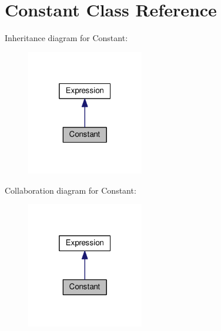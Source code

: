 \hypertarget{classConstant}{}\section{Constant Class Reference}
\label{classConstant}


Inheritance diagram for Constant\+:\nopagebreak
\begin{figure}[H]
\begin{center}
\leavevmode
\includegraphics[width=145pt]{classConstant__inherit__graph}
\end{center}
\end{figure}


Collaboration diagram for Constant\+:\nopagebreak
\begin{figure}[H]
\begin{center}
\leavevmode
\includegraphics[width=145pt]{classConstant__coll__graph}
\end{center}
\end{figure}
